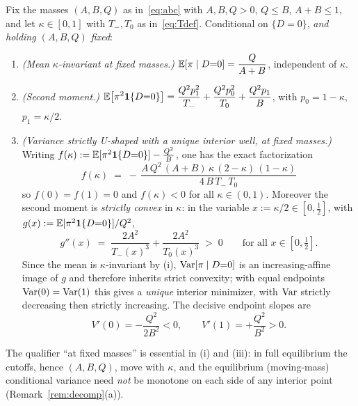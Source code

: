 \begin{lemma}\label{lem:variance}
Fix the masses $(A,B,Q)$ as in~\eqref{eq:abc} with $A,B,Q>0$, $Q\le B$,
$A+B\le1$, and let $\kappa\in[0,1]$ with $T_-,T_0$ as in~\eqref{eq:Tdef}.
Conditional on $\{D=0\}$, \emph{and holding $(A,B,Q)$ fixed}:
\begin{enumerate}
\item[\textup{(i)}] \emph{(Mean $\kappa$-invariant at fixed masses.)}
$\displaystyle \mathbb{E}[\pi\mid D{=}0]=\frac{Q}{A+B}$, independent of $\kappa$.
\item[\textup{(ii)}] \emph{(Second moment.)}
$\displaystyle \mathbb{E}\bigl[\pi^2\mathbf{1}\{D{=}0\}\bigr]
=\frac{Q^2p_1^2}{T_-}+\frac{Q^2p_0^2}{T_0}+\frac{Q^2 p_1}{B}$,
with $p_0=1-\kappa$, $p_1=\kappa/2$.
\item[\textup{(iii)}] \emph{(Variance strictly U-shaped with a unique interior
well, at fixed masses.)} Writing
$f(\kappa):=\mathbb{E}[\pi^2\mathbf{1}\{D{=}0\}]-\tfrac{Q^2}{B}$, one has the exact factorization
\begin{equation}\label{eq:fclosed}
\boxed{\;
f(\kappa)\;=\;-\,\frac{A\,Q^{2}\,(A+B)\,\kappa\,(2-\kappa)\,(1-\kappa)}
                      {4\,B\,T_-\,T_0}\;}
\end{equation}
so $f(0)=f(1)=0$ and $f(\kappa)<0$ for all $\kappa\in(0,1)$. Moreover the second
moment is \emph{strictly convex} in $\kappa$: in the variable
$x:=\kappa/2\in[0,\tfrac12]$, with $g(x):=\mathbb{E}[\pi^2\mathbf{1}\{D{=}0\}]/Q^2$,
\begin{equation}\label{eq:gconvex}
   g''(x)\;=\;\frac{2A^2}{T_-(x)^3}+\frac{2A^2}{T_0(x)^3}\;>\;0
   \qquad\text{for all }x\in[0,\tfrac12].
\end{equation}
Since the mean is $\kappa$-invariant by (i), $\operatorname{Var}[\pi\mid D{=}0]$ is an
increasing-affine image of $g$ and therefore inherits strict convexity; with
equal endpoints $\operatorname{Var}(0)=\operatorname{Var}(1)$ this gives a \emph{unique} interior minimizer,
with $\operatorname{Var}$ strictly decreasing then strictly increasing. The decisive endpoint
slopes are
\begin{equation}\label{eq:Vslopes}
   V'(0)=-\frac{Q^2}{2B^2}<0,\qquad V'(1)=+\frac{Q^2}{B^2}>0 .
\end{equation}
\end{enumerate}
The qualifier ``at fixed masses'' is essential in \textup{(i)} and
\textup{(iii)}: in full equilibrium the cutoffs, hence $(A,B,Q)$, move with
$\kappa$, and the equilibrium (moving-mass) conditional variance need \emph{not}
be monotone on each side of any interior point (Remark~\ref{rem:decomp}(a)).
\end{lemma}

